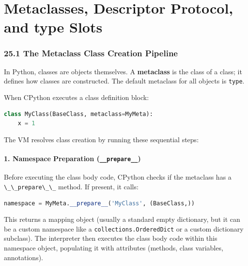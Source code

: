 \hypertarget{metaclasses-descriptor-protocol-and-type-slots}{%
\chapter{Metaclasses, Descriptor Protocol, and type
Slots}\label{metaclasses-descriptor-protocol-and-type-slots}}

\hypertarget{the-metaclass-class-creation-pipeline}{%
\subsection{25.1 The Metaclass Class Creation
Pipeline}\label{the-metaclass-class-creation-pipeline}}

In Python, classes are objects themselves. A \textbf{metaclass} is the
class of a class; it defines how classes are constructed. The default
metaclass for all objects is \passthrough{\lstinline!type!}.

When CPython executes a class definition block:

\begin{lstlisting}[language=Python]
class MyClass(BaseClass, metaclass=MyMeta):
    x = 1
\end{lstlisting}

The VM resolves class creation by running these sequential steps:

\hypertarget{namespace-preparation-__prepare__}{%
\subsubsection{\texorpdfstring{1. Namespace Preparation
(\texttt{\_\_prepare\_\_})}{1. Namespace Preparation (\_\_prepare\_\_)}}\label{namespace-preparation-__prepare__}}

Before executing the class body code, CPython checks if the metaclass
has a \passthrough{\lstinline!\_\_prepare\_\_!} method. If present, it
calls:

\begin{lstlisting}[language=Python]
namespace = MyMeta.__prepare__('MyClass', (BaseClass,))
\end{lstlisting}

This returns a mapping object (usually a standard empty dictionary, but
it can be a custom namespace like a
\passthrough{\lstinline!collections.OrderedDict!} or a custom dictionary
subclass). The interpreter then executes the class body code within this
namespace object, populating it with attributes (methods, class
variables, annotations).


